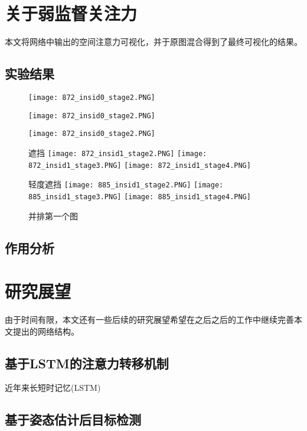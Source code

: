 \section{关于弱监督关注力}
\label{sec:weaksuperatten}
本文将网络中输出的空间注意力可视化，并于原图混合得到了最终可视化的结果。
\subsection{实验结果}
\label{subsec:attenexp}
\begin{figure}
	\begin{subfigure}
		\begin{minipage}{0.333\textwidth}
			\texttt{[image: 872\_insid0\_stage2.PNG]}
		\end{minipage}
		\begin{minipage}{0.333\textwidth}
			\texttt{[image: 872\_insid0\_stage2.PNG]}
		\end{minipage}
		\begin{minipage}{0.333\textwidth}
			\texttt{[image: 872\_insid0\_stage2.PNG]}
		\end{minipage}
	\end{subfigure}
	\vskip0.2cm
	\begin{minipage}{\textwidth}
		遮挡
		\centering
		\texttt{[image: 872\_insid1\_stage2.PNG]}
		\texttt{[image: 872\_insid1\_stage3.PNG]}
		\texttt{[image: 872\_insid1\_stage4.PNG]}
	\end{minipage}
	\begin{minipage}{\textwidth}
		轻度遮挡
		\centering
		\texttt{[image: 885\_insid1\_stage2.PNG]}
		\texttt{[image: 885\_insid1\_stage3.PNG]}
		\texttt{[image: 885\_insid1\_stage4.PNG]}
	\end{minipage}
	\label{fig:parallel1}
	\caption{并排第一个图}
\end{figure}

\subsection{作用分析}
\label{subsec:attenstudy}

\section{研究展望}
\label{sec:future}
由于时间有限，本文还有一些后续的研究展望希望在之后之后的工作中继续完善本文提出的网络结构。
\subsection{基于LSTM的注意力转移机制}
\label{subsec:lstmatten}
近年来长短时记忆(LSTM)
\subsection{基于姿态估计后目标检测}
\label{subsec:semisuperdetect}